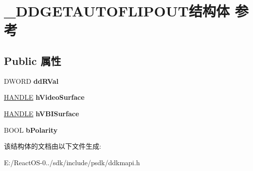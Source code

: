 \hypertarget{struct___d_d_g_e_t_a_u_t_o_f_l_i_p_o_u_t}{}\section{\+\_\+\+D\+D\+G\+E\+T\+A\+U\+T\+O\+F\+L\+I\+P\+O\+U\+T结构体 参考}
\label{struct___d_d_g_e_t_a_u_t_o_f_l_i_p_o_u_t}
\subsection*{Public 属性}
\begin{DoxyCompactItemize}
\item 
\mbox{\label{struct___d_d_g_e_t_a_u_t_o_f_l_i_p_o_u_t_a90c519e78bdd0fc2d244149c2a0040f8}} 
D\+W\+O\+RD {\bfseries dd\+R\+Val}
\item 
\mbox{\label{struct___d_d_g_e_t_a_u_t_o_f_l_i_p_o_u_t_ab60bcd3c6ee3332b9512e7d3300d1088}} 
\hyperlink{interfacevoid}{H\+A\+N\+D\+LE} {\bfseries h\+Video\+Surface}
\item 
\mbox{\label{struct___d_d_g_e_t_a_u_t_o_f_l_i_p_o_u_t_a424820e4967bed9ae73636e294aca035}} 
\hyperlink{interfacevoid}{H\+A\+N\+D\+LE} {\bfseries h\+V\+B\+I\+Surface}
\item 
\mbox{\label{struct___d_d_g_e_t_a_u_t_o_f_l_i_p_o_u_t_a449562ec0b85499a22b212eb39798281}} 
B\+O\+OL {\bfseries b\+Polarity}
\end{DoxyCompactItemize}


该结构体的文档由以下文件生成\+:\begin{DoxyCompactItemize}
\item 
E\+:/\+React\+O\+S-\/0../sdk/include/psdk/ddkmapi.\+h\end{DoxyCompactItemize}
